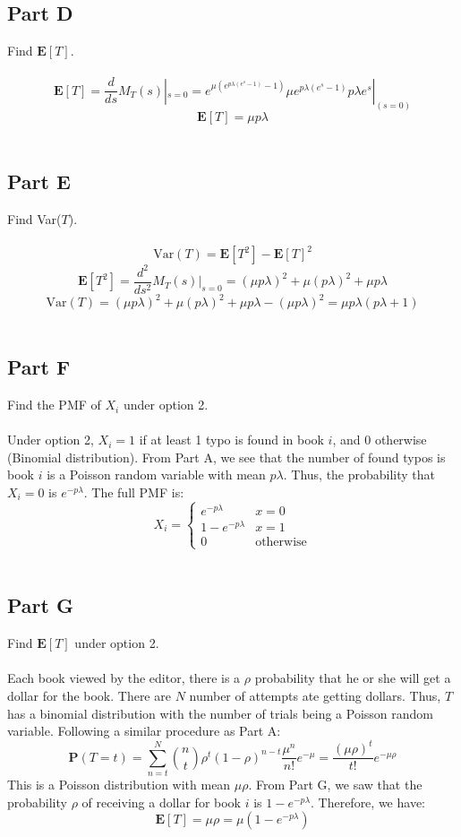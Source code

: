 \documentclass{amsart}
\begin{document}
	\subsection{Part D}
	Find $\mathbf{E}[T]$.\\
	\\
	\[
	\mathbf{E}[T] = \frac{d}{ds}M_T(s)|_{s=0} = e^{\mu\left(e^{p\lambda(e^s-1)}-1\right)}\mu e^{p\lambda(e^s-1)}p\lambda e^s|_(s=0)
	\]
	\[
	\mathbf{E}[T] = \mu p\lambda
	\]
	\\
	\subsection{Part E}
	Find Var($T$).\\
	\\
	\[
	\text{Var}(T) = \mathbf{E}[T^2]-\mathbf{E}[T]^2
	\]
	\[
	\mathbf{E}[T^2] = \frac{d^2}{ds^2}M_T(s)|_{s=0}
	= (\mu p\lambda)^2 + \mu(p\lambda)^2 + \mu p\lambda
	\]
	\[
	\text{Var}(T) = (\mu p\lambda)^2 + \mu(p\lambda)^2 + \mu p\lambda - (\mu p\lambda)^2 = \mu p\lambda(p\lambda + 1)
	\]
	\\
	\subsection{Part F}
	Find the PMF of $X_i$ under option 2.\\
	\\
	Under option 2, $X_i = 1$ if at least 1 typo is found in book $i$, and 0 otherwise (Binomial distribution). From Part A, we see that the  number of found typos is book $i$ is a Poisson random variable with mean $p \lambda$. Thus, the probability that $X_i=0$ is $e^{-p \lambda}$. The full PMF is:
	\[
	X_i = 
	\begin{cases}
		e^{-p\lambda} & x=0\\
		1-e^{-p\lambda} &x=1\\
		0 & \text{otherwise}
	\end{cases}
	\]
	\\
	\subsection{Part G}
	Find $\mathbf{E}[T]$ under option 2.\\
	\\
	Each book viewed by the editor, there is a $\rho$ probability that he or she will get a dollar for the book. There are $N$ number of attempts ate getting dollars. Thus, $T$ has a binomial distribution with the number of trials being a Poisson random variable. Following a similar procedure as Part A:
	\[
		\mathbf{P}(T=t) = \sum_{n=t}^{N}\binom{n}{t}\rho^t(1-\rho)^{n-t}\frac{\mu^n}{n!}e^{-\mu} = \frac{(\mu\rho)^t}{t!}e^{-\mu\rho}
	\]
	This is a Poisson distribution with mean $\mu\rho$. From Part G, we saw that the probability $\rho$ of receiving a dollar for book $i$ is $1-e^{-p\lambda}$. Therefore, we have:
	\[
	\mathbf{E}[T] = \mu\rho = \mu(1-e^{-p\lambda})
	\] 
	\\
\end{document}
